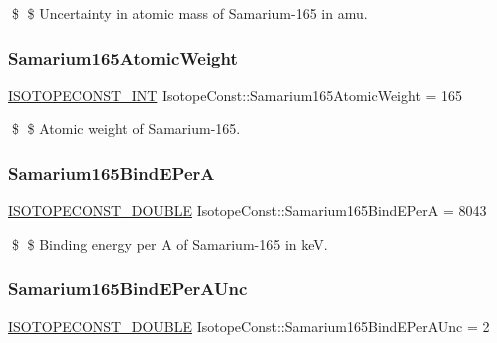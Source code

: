 \$ \$ Uncertainty in atomic mass of Samarium-\/165 in amu. \mbox{\label{group___isotope_const-_samarium-_sm165_ga084904cf9fe68da9266b1e71279a8bc1}} 
\subsubsection{\texorpdfstring{Samarium165\+Atomic\+Weight}{Samarium165AtomicWeight}}
{\footnotesize\ttfamily \mbox{\hyperlink{group___isotope_const-_macros_ga5f18360b3e99483a35c32d789e62621c}{I\+S\+O\+T\+O\+P\+E\+C\+O\+N\+S\+T\+\_\+\+I\+NT}} Isotope\+Const\+::\+Samarium165\+Atomic\+Weight = 165}

\$ \$ Atomic weight of Samarium-\/165. \mbox{\label{group___isotope_const-_samarium-_sm165_ga1cb5e7b454f99caa133795cb3462ea17}} 
\subsubsection{\texorpdfstring{Samarium165\+Bind\+E\+PerA}{Samarium165BindEPerA}}
{\footnotesize\ttfamily \mbox{\hyperlink{group___isotope_const-_macros_ga8f45a7272ce02c0b4c65c44636ed719a}{I\+S\+O\+T\+O\+P\+E\+C\+O\+N\+S\+T\+\_\+\+D\+O\+U\+B\+LE}} Isotope\+Const\+::\+Samarium165\+Bind\+E\+PerA = 8043}

\$ \$ Binding energy per A of Samarium-\/165 in keV. \mbox{\label{group___isotope_const-_samarium-_sm165_ga927338e1b47c1a339e5f8edc6348e59f}} 
\subsubsection{\texorpdfstring{Samarium165\+Bind\+E\+Per\+A\+Unc}{Samarium165BindEPerAUnc}}
{\footnotesize\ttfamily \mbox{\hyperlink{group___isotope_const-_macros_ga8f45a7272ce02c0b4c65c44636ed719a}{I\+S\+O\+T\+O\+P\+E\+C\+O\+N\+S\+T\+\_\+\+D\+O\+U\+B\+LE}} Isotope\+Const\+::\+Samarium165\+Bind\+E\+Per\+A\+Unc = 2}

